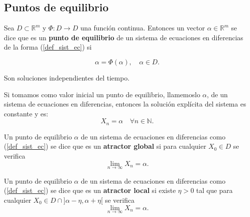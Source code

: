 \subsection{Puntos de equilibrio}

\begin{definition}
Sea $D\subset \mathbb{R}^m$ y $\Phi :D\rightarrow D$ una función continua. Entonces un vector $\alpha \in \mathbb{R}^m$ se dice que es un \textbf{punto de equilibrio} de un sistema de ecuaciones en diferencias de la forma (\ref{def_sist_ec}) si

$$\alpha = \Phi (\alpha),\quad \alpha \in D.$$

Son soluciones independientes del tiempo.
\end{definition}

\begin{proposition}
Si tomamos como valor inicial un punto de equilibrio, llamemoslo $\alpha$, de un sistema de ecuaciones en diferencias, entonces la solución explícita del sistema es constante y es:
$$X_n = \alpha \quad \forall n\in\mathbb{N}.$$
\end{proposition}

\begin{definition}
Un punto de equilibrio $\alpha$ de un sistema de ecuaciones en diferencias como (\ref{def_sist_ec}) se dice que es un \textbf{atractor global} si para cualquier $X_0\in D$ se verifica
$$\displaystyle\lim_{n\to \infty} X_n = \alpha.$$
\end{definition}

\begin{definition}
Un punto de equilibrio $\alpha$ de un sistema de ecuaciones en diferencias como (\ref{def_sist_ec}) se dice que es un \textbf{atractor local} si existe $\eta>0$ tal que para cualquier $X_0\in D\cap \text{]}\alpha -\eta , \alpha + \eta \text{[}$ se verifica
$$\displaystyle\lim_{n\to \infty} X_n = \alpha.$$

\end{definition}